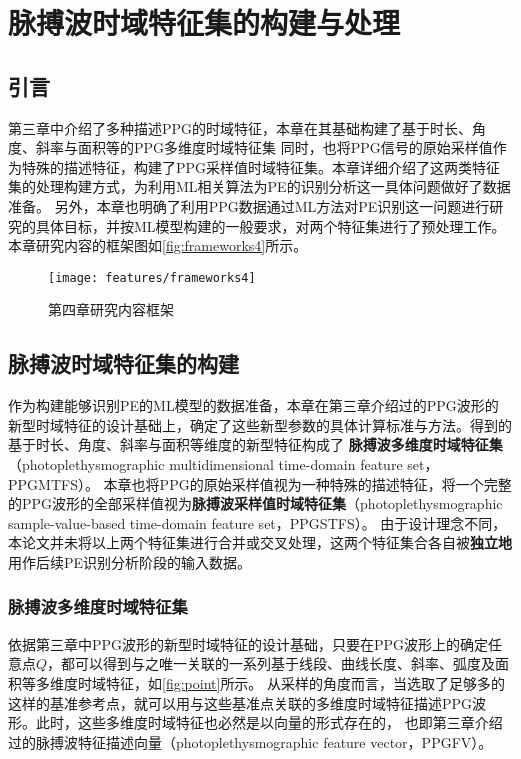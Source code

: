 \chapter{脉搏波时域特征集的构建与处理}
\section{引言}
第三章中介绍了多种描述PPG的时域特征，本章在其基础构建了基于时长、角度、斜率与面积等的PPG多维度时域特征集
同时，也将PPG信号的原始采样值作为特殊的描述特征，构建了PPG采样值时域特征集。本章详细介绍了这两类特征集的处理构建方式，为利用ML相关算法为PE的识别分析这一具体问题做好了数据准备。
另外，本章也明确了利用PPG数据通过ML方法对PE识别这一问题进行研究的具体目标，并按ML模型构建的一般要求，对两个特征集进行了预处理工作。
本章研究内容的框架图如\autoref{fig:frameworks4}所示。

\begin{figure}[htbp]
  \centering
  \texttt{[image: features/frameworks4]}
  \caption{\label{fig:frameworks4}第四章研究内容框架}
\end{figure}
\section{脉搏波时域特征集的构建}
作为构建能够识别PE的ML模型的数据准备，本章在第三章介绍过的PPG波形的新型时域特征的设计基础上，确定了这些新型参数的具体计算标准与方法。得到的基于时长、角度、斜率与面积等维度的新型特征构成了
\textbf{脉搏波多维度时域特征集}（photoplethysmographic multidimensional time-domain feature set，PPGMTFS）。
本章也将PPG的原始采样值视为一种特殊的描述特征，将一个完整的PPG波形的全部采样值视为\textbf{脉搏波采样值时域特征集}（photoplethysmographic sample-value-based time-domain feature set，PPGSTFS）。
由于设计理念不同，本论文并未将以上两个特征集进行合并或交叉处理，这两个特征集合各自被\textbf{独立地}用作后续PE识别分析阶段的输入数据。

\subsection{脉搏波多维度时域特征集}

依据第三章中PPG波形的新型时域特征的设计基础，只要在PPG波形上的确定任意点$Q$，都可以得到与之唯一关联的一系列基于线段、曲线长度、斜率、弧度及面积等多维度时域特征，如\autoref{fig:point}所示。
从采样的角度而言，当选取了足够多的这样的基准参考点，就可以用与这些基准点关联的多维度时域特征描述PPG波形。此时，这些多维度时域特征也必然是以向量的形式存在的，
也即第三章介绍过的脉搏波特征描述向量（photoplethysmographic feature vector，PPGFV）。

